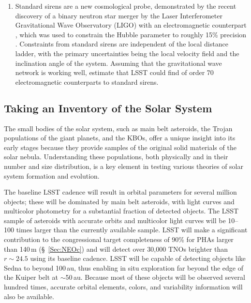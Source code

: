 \begin{enumerate}
\item Standard sirens are a new cosmological probe, demonstrated by the recent discovery of a binary
  neutron star merger by the Laser Interferometer Gravitational Wave Observatory (LIGO) with an electromagnetic counterpart \citep{2017ApJ...848L..12A}, which was
  used to constrain the Hubble parameter to roughly 15\% precision \citep{2017Natur.551...85A}.
  Constraints from standard sirens are independent of the local distance ladder, with the primary
  uncertainties being the local velocity field and the inclination angle of the system.  Assuming that
  the gravitational wave network is working well, \citet{2018ApJ...852L...3S}
  estimate that LSST could find of order 70 electromagnetic counterparts to standard sirens.
\end{enumerate}


\subsection{Taking an Inventory of the Solar System}

The small bodies of the solar system, such as main belt asteroids,
the Trojan populations of the giant planets, and the KBOs,
offer a unique insight into its early stages because they provide
samples of the original solid materials of the solar nebula.
Understanding these populations, both physically and in their number
and size distribution, is a key element in testing various theories of
solar system formation and evolution.

The baseline LSST cadence will result in orbital parameters for several
million objects; these will be dominated by main belt asteroids, with
light curves and multicolor photometry for a substantial fraction of detected objects.
The LSST sample of asteroids with accurate orbits and multicolor light curves
will be 10--100 times larger than the currently available sample.
LSST will make a significant contribution to the congressional target
completeness of 90\% for PHAs larger than 140\,m (\S~\ref{Sec:NEOc}) and will detect over 30,000 TNOs brighter than $r\sim24.5$ using its baseline cadence. LSST will be capable
of detecting objects like Sedna to beyond 100\,au, thus enabling in situ exploration
far beyond the edge of the Kuiper belt at $\sim$50\,au. Because most of these
objects will be observed several hundred times, accurate orbital elements,
colors, and variability information will also be available.


